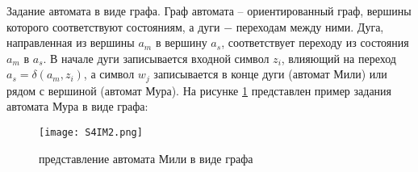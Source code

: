 \subsubsection{}
Задание автомата в виде графа.
Граф автомата – ориентированный граф, вершины которого соответствуют состояниям, а дуги − переходам между ними. Дуга, направленная из вершины $a_m$ в вершину $a_s$, соответствует переходу из состояния $a_m$ в $a_s$. В начале дуги записывается входной символ $z_i$, влияющий на переход $a_s = \delta(a_m, z_i)$, а символ $w_j$ записывается в конце дуги (автомат Мили) или рядом с вершиной (автомат Мура).\cite{demid}  На рисунке \ref{fig:section4:grafOfMili} представлен пример задания автомата Мура в виде графа:

\begin{figure}[ht!]
    \centering
    \texttt{[image: S4IM2.png]}
    \caption{представление автомата Мили в виде графа}
    \label{fig:section4:grafOfMili}
\end{figure}


